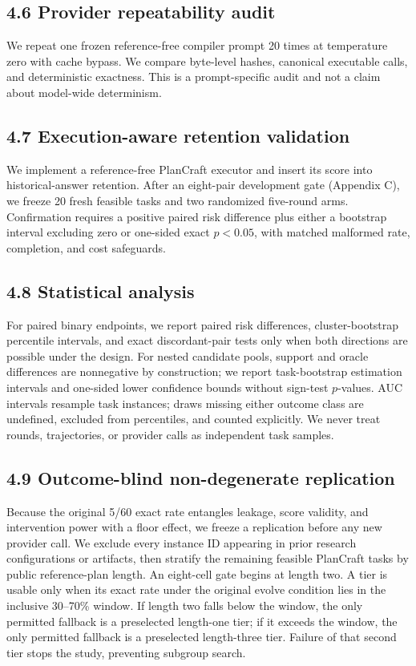 \documentclass{article}
\begin{document}
\subsection{4.6 Provider repeatability audit}

We repeat one frozen reference-free compiler prompt 20 times at temperature zero with cache bypass. We compare byte-level hashes, canonical executable calls, and deterministic exactness. This is a prompt-specific audit and not a claim about model-wide determinism.

\subsection{4.7 Execution-aware retention validation}

We implement a reference-free PlanCraft executor and insert its score into historical-answer retention. After an eight-pair development gate (Appendix C), we freeze 20 fresh feasible tasks and two randomized five-round arms. Confirmation requires a positive paired risk difference plus either a bootstrap interval excluding zero or one-sided exact \(p<0.05\), with matched malformed rate, completion, and cost safeguards.

\subsection{4.8 Statistical analysis}

For paired binary endpoints, we report paired risk differences, cluster-bootstrap percentile intervals, and exact discordant-pair tests only when both directions are possible under the design. For nested candidate pools, support and oracle differences are nonnegative by construction; we report task-bootstrap estimation intervals and one-sided lower confidence bounds without sign-test \(p\)-values. AUC intervals resample task instances; draws missing either outcome class are undefined, excluded from percentiles, and counted explicitly. We never treat rounds, trajectories, or provider calls as independent task samples.

\subsection{4.9 Outcome-blind non-degenerate replication}

Because the original 5/60 exact rate entangles leakage, score validity, and intervention power with a floor effect, we freeze a replication before any new provider call. We exclude every instance ID appearing in prior research configurations or artifacts, then stratify the remaining feasible PlanCraft tasks by public reference-plan length. An eight-cell gate begins at length two. A tier is usable only when its exact rate under the original evolve condition lies in the inclusive 30--70\% window. If length two falls below the window, the only permitted fallback is a preselected length-one tier; if it exceeds the window, the only permitted fallback is a preselected length-three tier. Failure of that second tier stops the study, preventing subgroup search.
\end{document}
